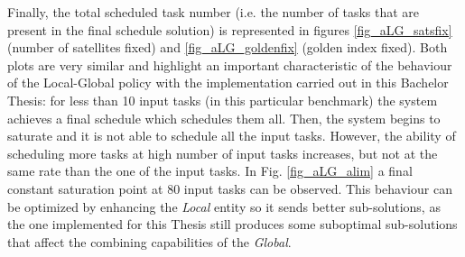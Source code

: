 Finally, the total scheduled task number (i.e. the number of tasks that are present in the final schedule solution) is represented in figures \ref{fig_aLG_satsfix} (number of satellites fixed) and \ref{fig_aLG_goldenfix} (golden index fixed). Both plots are very similar and highlight an important characteristic of the behaviour of the Local-Global policy with the implementation carried out in this Bachelor Thesis: for less than 10 input tasks (in this particular benchmark) the system achieves a final schedule which schedules them all. Then, the system begins to saturate and it is not able to schedule all the input tasks. However, the ability of scheduling more tasks at high number of input tasks increases, but not at the same rate than the one of the input tasks. In Fig. \ref{fig_aLG_alim} a final constant saturation point at 80 input tasks can be observed. This behaviour can be optimized by enhancing the \emph{Local} entity so it sends better sub-solutions, as the one implemented for this Thesis still produces some suboptimal sub-solutions that affect the combining capabilities of the \emph{Global}.

